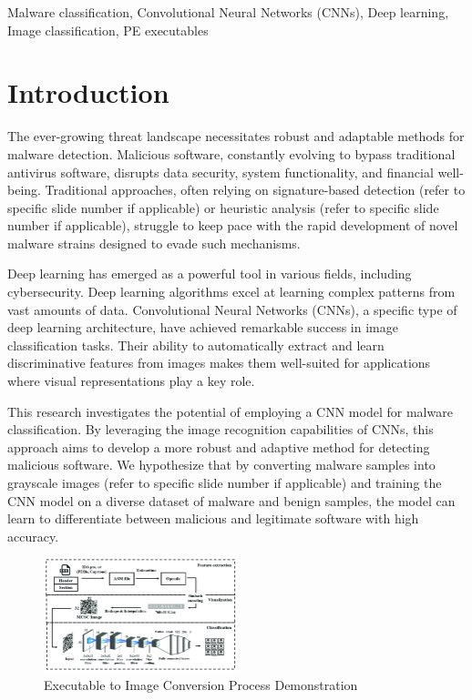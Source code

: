 \documentclass[conference]{IEEEtran}
\begin{document}
\begin{IEEEkeywords}
Malware classification,
Convolutional Neural Networks (CNNs),
Deep learning,
Image classification,
PE executables
\end{IEEEkeywords}

\section{Introduction}
The ever-growing threat landscape necessitates robust and adaptable methods for malware detection. Malicious software, constantly evolving to bypass traditional antivirus software, disrupts data security, system functionality, and financial well-being. Traditional approaches, often relying on signature-based detection (refer to specific slide number if applicable) or heuristic analysis (refer to specific slide number if applicable), struggle to keep pace with the rapid development of novel malware strains designed to evade such mechanisms.

Deep learning has emerged as a powerful tool in various fields, including cybersecurity. Deep learning algorithms excel at learning complex patterns from vast amounts of data. Convolutional Neural Networks (CNNs), a specific type of deep learning architecture, have achieved remarkable success in image classification tasks. Their ability to automatically extract and learn discriminative features from images makes them well-suited for applications where visual representations play a key role.

This research investigates the potential of employing a CNN model for malware classification. By leveraging the image recognition capabilities of CNNs, this approach aims to develop a more robust and adaptive method for detecting malicious software. We hypothesize that by converting malware samples into grayscale images (refer to specific slide number if applicable) and training the CNN model on a diverse dataset of malware and benign samples, the model can learn to differentiate between malicious and legitimate software with high accuracy.


\begin{figure}[ht] %
  \centering %
  \includegraphics[width=0.5\textwidth]{The-overall-procedure-of-malware-classification-using-Simhash-and-CNN-MCSC-algorithm.png} %
  \caption{Executable to Image Conversion Process Demonstration } %
  \label{fig:example} %
\end{figure}
\end{document}
